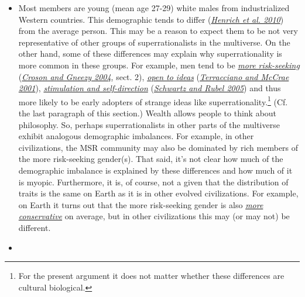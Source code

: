 \begin{itemize}
\item
  Most members are young (mean age 27-29) white males from
  industrialized Western countries. This demographic tends to differ
  (\href{http://hci.ucsd.edu/102b/readings/WeirdestPeople.pdf}{\emph{Henrich
  et al. 2010}}) from the average person. This may be a reason to expect
  them to be not very representative of other groups of
  superrationalists in the multiverse. On the other hand, some of these
  differences may explain why superrationality is more common in these
  groups. For example, men tend to be
  \href{http://www.njl.nu/uploads/Forskning__Croson__Gneezy.pdf\#page=4}{\emph{more
  risk-seeking}}
  (\href{http://www.njl.nu/uploads/Forskning__Croson__Gneezy.pdf}{\emph{Croson
  and Gneezy 2004}}, sect. 2),
  \href{http://citeseerx.ist.psu.edu/viewdoc/download?doi=10.1.1.502.9219\&rep=rep1\&type=pdf}{\emph{open
  to ideas}}
  (\href{http://citeseerx.ist.psu.edu/viewdoc/download?doi=10.1.1.502.9219\&rep=rep1\&type=pdf}{\emph{Terracciano
  and McCrae 2001}}),
  \href{http://dip38.psi.uniroma1.it/sites/default/files/persone/sensalesg/materiale/Schwatrz\%20e\%20Rubel\%202005\%20sex\%20dif\%20in\%20value.pdf}{\emph{stimulation
  and self-direction}}
  (\href{http://dip38.psi.uniroma1.it/sites/default/files/persone/sensalesg/materiale/Schwatrz\%20e\%20Rubel\%202005\%20sex\%20dif\%20in\%20value.pdf}{\emph{Schwartz
  and Rubel 2005}}) and thus more likely to be early adopters of strange
  ideas like superrationality.\footnote{For the present argument it does
    not matter whether these differences are cultural biological.} (Cf.
  the last paragraph of this section.) Wealth allows people to think
  about philosophy. So, perhaps superrationalists in other parts of the
  multiverse exhibit analogous demographic imbalances. For example, in
  other civilizations, the MSR community may also be dominated by rich
  members of the more risk-seeking gender(s). That said, it's not clear
  how much of the demographic imbalance is explained by these
  differences and how much of it is myopic. Furthermore, it is, of
  course, not a given that the distribution of traits is the same on
  Earth as it is in other evolved civilizations. For example, on Earth
  it turns out that the more risk-seeking gender is also
  \href{http://www.gallup.com/poll/120839/women-likely-democrats-regardless-age.aspx}{\emph{more
  conservative}} on average, but in other civilizations this may (or may
  not) be different.
\item
  \begin{quote}

\end{quote}
\end{itemize}
